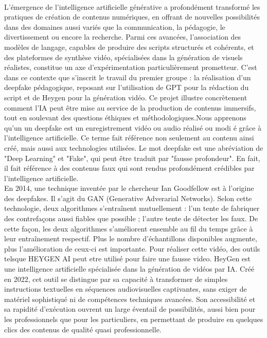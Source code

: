 \documentclass[]{article}
\begin{document}
\paragraph{}
L'émergence de l'intelligence artificielle générative a profondément transformé les pratiques de création de contenus numériques, en offrant de nouvelles possibilités dans des domaines aussi variés que la communication, la pédagogie, le divertissement ou encore la recherche. Parmi ces avancées, l'association des modèles de langage, capables de produire des scripts structurés et cohérents, et des plateformes de synthèse vidéo, spécialisées dans la génération de visuels réalistes, constitue un axe d'expérimentation particulièrement prometteur. C'est dans ce contexte que s'inscrit le travail du premier groupe : la réalisation d'un deepfake pédagogique, reposant sur l'utilisation de GPT pour la rédaction du script et de Heygen pour la génération vidéo. Ce projet illustre concrètement comment l'IA peut être mise au service de la production de contenus immersifs, tout en soulevant des questions éthiques et méthodologiques.Nous apprenons qu’un un deepfake est un enregistrement vidéo ou audio réalisé ou modi é grâce à l'intelligence artificielle. Ce terme fait référence non seulement au contenu ainsi créé, mais aussi aux technologies utilisées. Le mot deepfake est une abréviation de "Deep Learning" et "Fake", qui peut être traduit par "fausse profondeur". En fait, il fait référence à des contenus faux qui sont rendus profondément crédibles par l'intelligence artificielle.\\ En 2014, une technique inventée par le chercheur Ian Goodfellow est à l'origine des deepfakes. Il s'agit du GAN (Generative Adverarial Networks). Selon cette technologie, deux algorithmes s'entraînent mutuellement : l'un tente de fabriquer des contrefaçons aussi fiables que possible ; l'autre tente de détecter les faux. De cette façon, les deux algorithmes s'améliorent ensemble au fil du temps grâce à leur entraînement respectif. Plus le nombre d'échantillons disponibles augmente, plus l'amélioration de ceux-ci est importante. Pour réaliser cette vidéo, des outils telsque HEYGEN AI peut etre utilisé pour faire une fausse video. HeyGen est une intelligence artificielle spécialisée dans la génération de vidéos par IA. Créé en 2022, cet outil se distingue par sa capacité à transformer de simples instructions textuelles en séquences audiovisuelles captivantes, sans exiger de matériel sophistiqué ni de compétences techniques avancées. Son accessibilité et sa rapidité d'exécution ouvrent un large éventail de possibilités, aussi bien pour les professionnels que pour les particuliers, en permettant de produire en quelques clics des contenus de qualité quasi professionnelle.
\end{document}
